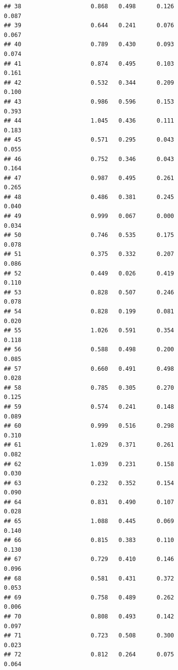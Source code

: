 \documentclass[]{article}
\begin{document}
\begin{verbatim}
## 38                    0.868   0.498      0.126                     0.087
## 39                    0.644   0.241      0.076                     0.067
## 40                    0.789   0.430      0.093                     0.074
## 41                    0.874   0.495      0.103                     0.161
## 42                    0.532   0.344      0.209                     0.100
## 43                    0.986   0.596      0.153                     0.393
## 44                    1.045   0.436      0.111                     0.183
## 45                    0.571   0.295      0.043                     0.055
## 46                    0.752   0.346      0.043                     0.164
## 47                    0.987   0.495      0.261                     0.265
## 48                    0.486   0.381      0.245                     0.040
## 49                    0.999   0.067      0.000                     0.034
## 50                    0.746   0.535      0.175                     0.078
## 51                    0.375   0.332      0.207                     0.086
## 52                    0.449   0.026      0.419                     0.110
## 53                    0.828   0.507      0.246                     0.078
## 54                    0.828   0.199      0.081                     0.020
## 55                    1.026   0.591      0.354                     0.118
## 56                    0.588   0.498      0.200                     0.085
## 57                    0.660   0.491      0.498                     0.028
## 58                    0.785   0.305      0.270                     0.125
## 59                    0.574   0.241      0.148                     0.089
## 60                    0.999   0.516      0.298                     0.310
## 61                    1.029   0.371      0.261                     0.082
## 62                    1.039   0.231      0.158                     0.030
## 63                    0.232   0.352      0.154                     0.090
## 64                    0.831   0.490      0.107                     0.028
## 65                    1.088   0.445      0.069                     0.140
## 66                    0.815   0.383      0.110                     0.130
## 67                    0.729   0.410      0.146                     0.096
## 68                    0.581   0.431      0.372                     0.053
## 69                    0.758   0.489      0.262                     0.006
## 70                    0.808   0.493      0.142                     0.097
## 71                    0.723   0.508      0.300                     0.023
## 72                    0.812   0.264      0.075                     0.064

\end{verbatim}
\end{document}
